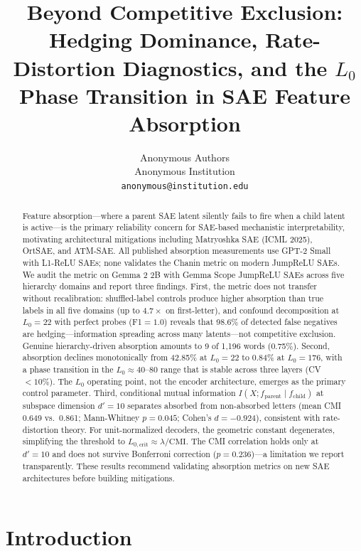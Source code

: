 \documentclass{article}
\title{Beyond Competitive Exclusion: Hedging Dominance, Rate-Distortion Diagnostics, and the $L_0$ Phase Transition in SAE Feature Absorption}
\author{%
  Anonymous Authors \\
  Anonymous Institution \\
  \texttt{anonymous@institution.edu} \\
}
\begin{document}
\maketitle

\begin{abstract}
Feature absorption---where a parent SAE latent silently fails to fire when a child latent is active---is the primary reliability concern for SAE-based mechanistic interpretability, motivating architectural mitigations including Matryoshka SAE (ICML 2025), OrtSAE, and ATM-SAE. All published absorption measurements use GPT-2 Small with L1-ReLU SAEs; none validates the Chanin metric on modern JumpReLU SAEs. We audit the metric on Gemma 2 2B with Gemma Scope JumpReLU SAEs across five hierarchy domains and report three findings. First, the metric does not transfer without recalibration: shuffled-label controls produce higher absorption than true labels in all five domains (up to $4.7\times$ on first-letter), and confound decomposition at $L_0{=}22$ with perfect probes (F1${=}1.0$) reveals that 98.6\% of detected false negatives are hedging---information spreading across many latents---not competitive exclusion. Genuine hierarchy-driven absorption amounts to 9 of 1,196 words (0.75\%). Second, absorption declines monotonically from 42.85\% at $L_0{=}22$ to 0.84\% at $L_0{=}176$, with a phase transition in the $L_0 \approx 40$--$80$ range that is stable across three layers (CV $< 10\%$). The $L_0$ operating point, not the encoder architecture, emerges as the primary control parameter. Third, conditional mutual information $I(X; f_{\text{parent}} \mid f_{\text{child}})$ at subspace dimension $d'{=}10$ separates absorbed from non-absorbed letters (mean CMI 0.649 vs.\ 0.861; Mann-Whitney $p = 0.045$; Cohen's $d = -0.924$), consistent with rate-distortion theory. For unit-normalized decoders, the geometric constant degenerates, simplifying the threshold to $L_{0,\text{crit}} \approx \lambda / \text{CMI}$. The CMI correlation holds only at $d'{=}10$ and does not survive Bonferroni correction ($p = 0.236$)---a limitation we report transparently. These results recommend validating absorption metrics on new SAE architectures before building mitigations.
\end{abstract}


\section{Introduction}
\label{sec:intro}
\end{document}
